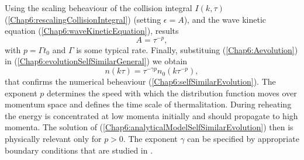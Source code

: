 \documentclass[11pt,a4paper,twoside]{book}
\begin{document}
Using the scaling beheaviour of the collision integral $ I(k,\tau) $ (\ref{Chap6:rescalingCollisionIntegral}) (setting $\epsilon=A$), and the wave kinetic equation (\ref{Chap6:waveKineticEquation}), results
\begin{equation}
	\label{Chap6:Aevolution}
A=\tau^{-p},
\end{equation}
with $ p=\Gamma t_{0} $ and $\Gamma$ is some typical rate. Finally, substituing (\ref{Chap6:Aevolution}) in (\ref{Chap6:evolutionSelfSimilarGeneral}) we obtain 
\begin{equation}
\label{Chap6:analyticalModelSelfSimilarEvolution}
n(k\tau)=\tau^{-\gamma p}n_{0}(k\tau^{-p}),
\end{equation}
that confirms the numerical beheaviour (\ref{Chap6:selfSimilarEvolution}). The exponent $ p $ determines the speed with which the distribution function moves over momentum space and defines the time scale of thermalitation. During reheating the energy is concentrated at low momenta initially and should propagate to high momenta. The solution of (\ref{Chap6:analyticalModelSelfSimilarEvolution}) then is physically relevant only for $ p>0 $. The exponent $\gamma$ can be specified by appropriate boundary conditions that are studied in \cite{Chap6:TurbolentThermalitation}.
\end{document}
